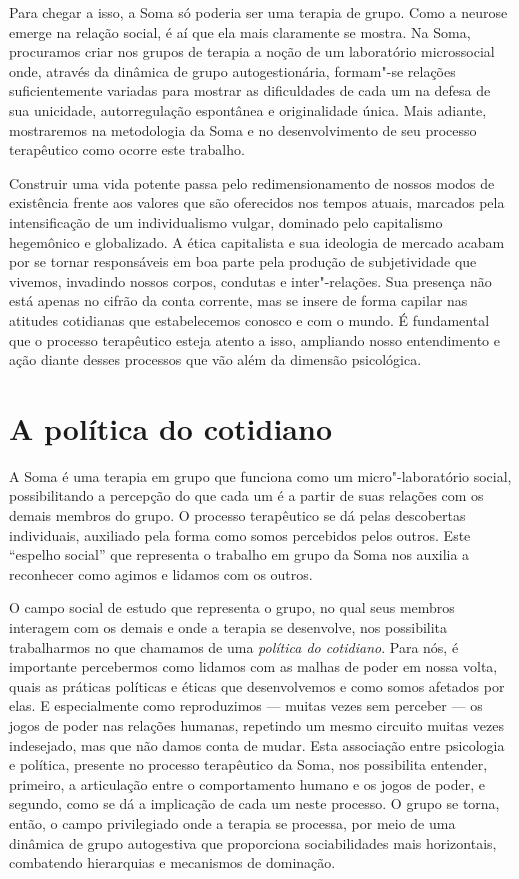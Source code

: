 Para chegar a isso, a Soma só poderia ser uma terapia de grupo. Como a
neurose emerge na relação social, é aí que ela mais claramente se
mostra. Na Soma, procuramos criar nos grupos de terapia a noção de um
laboratório microssocial onde, através da dinâmica de grupo
autogestionária, formam"-se relações suficientemente variadas para
mostrar as dificuldades de cada um na defesa de sua unicidade,
autorregulação espontânea e originalidade única. Mais adiante,
mostraremos na metodologia da Soma e no desenvolvimento de seu processo
terapêutico como ocorre este trabalho.

Construir uma vida potente passa pelo redimensionamento de nossos modos
de existência frente aos valores que são oferecidos nos tempos atuais,
marcados pela intensificação de um individualismo vulgar, dominado pelo
capitalismo hegemônico e globalizado. A ética capitalista e sua
ideologia de mercado acabam por se tornar responsáveis em boa parte pela
produção de subjetividade que vivemos, invadindo nossos corpos, condutas
e inter"-relações. Sua presença não está apenas no cifrão da conta
corrente, mas se insere de forma capilar nas atitudes cotidianas que
estabelecemos conosco e com o mundo. É fundamental que o processo
terapêutico esteja atento a isso, ampliando nosso entendimento e ação
diante desses processos que vão além da dimensão psicológica.

\section{A política do cotidiano}

A Soma é uma terapia em grupo que funciona como um micro"-laboratório
social, possibilitando a percepção do que cada um é a partir de suas
relações com os demais membros do grupo. O processo terapêutico se dá
pelas descobertas individuais, auxiliado pela forma como somos
percebidos pelos outros. Este ``espelho social'' que representa o
trabalho em grupo da Soma nos auxilia a reconhecer como agimos e lidamos
com os outros.

O campo social de estudo que representa o grupo, no qual seus membros
interagem com os demais e onde a terapia se desenvolve, nos possibilita
trabalharmos no que chamamos de uma \emph{política do cotidiano}. Para
nós, é importante percebermos como lidamos com as malhas de poder em
nossa volta, quais as práticas políticas e éticas que desenvolvemos e
como somos afetados por elas. E especialmente como reproduzimos --- muitas
vezes sem perceber --- os jogos de poder nas relações humanas, repetindo
um mesmo circuito muitas vezes indesejado, mas que não damos conta de
mudar. Esta associação entre psicologia e política, presente no processo
terapêutico da Soma, nos possibilita entender, primeiro, a articulação
entre o comportamento humano e os jogos de poder, e segundo, como se dá
a implicação de cada um neste processo. O grupo se torna, então, o campo
privilegiado onde a terapia se processa, por meio de uma dinâmica de
grupo autogestiva que proporciona sociabilidades mais horizontais,
combatendo hierarquias e mecanismos de dominação.

